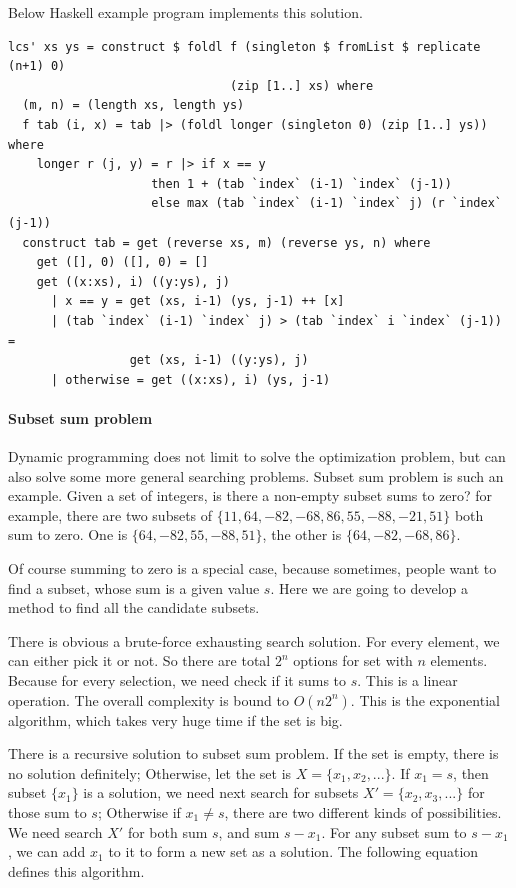 \documentclass[UTF8]{article}
\begin{document}
Below Haskell example program implements this solution.

\lstset{language=Haskell}
\begin{lstlisting}
lcs' xs ys = construct $ foldl f (singleton $ fromList $ replicate (n+1) 0)
                               (zip [1..] xs) where
  (m, n) = (length xs, length ys)
  f tab (i, x) = tab |> (foldl longer (singleton 0) (zip [1..] ys)) where
    longer r (j, y) = r |> if x == y
                    then 1 + (tab `index` (i-1) `index` (j-1))
                    else max (tab `index` (i-1) `index` j) (r `index` (j-1))
  construct tab = get (reverse xs, m) (reverse ys, n) where
    get ([], 0) ([], 0) = []
    get ((x:xs), i) ((y:ys), j)
      | x == y = get (xs, i-1) (ys, j-1) ++ [x]
      | (tab `index` (i-1) `index` j) > (tab `index` i `index` (j-1)) =
                 get (xs, i-1) ((y:ys), j)
      | otherwise = get ((x:xs), i) (ys, j-1)
\end{lstlisting}

\paragraph{Subset sum problem}
Dynamic programming does not limit to solve the optimization problem, but
can also solve some more general searching problems. Subset sum
problem is such an example. Given a set of integers, is there a non-empty
subset sums to zero? for example, there are
two subsets of
$\{11, 64, -82, -68, 86, 55, -88, -21, 51\}$ both sum to zero. One
is $\{64, -82, 55, -88, 51\}$, the other is $\{64, -82, -68, 86\}$.

Of course summing to zero is a special
case, because sometimes, people want to find a subset, whose sum is a
given value $s$. Here we are going to develop a method to find all the
candidate subsets.

There is obvious a brute-force exhausting search solution. For every
element, we can either pick it or not. So there are total $2^n$ options
for set with $n$ elements. Because for every selection, we need
check if it sums to $s$. This is a linear operation. The overall
complexity is bound to $O(n2^n)$. This is the exponential algorithm, which
takes very huge time if the set is big.

There is a recursive solution to subset sum problem. If the set is empty,
there is no solution definitely; Otherwise, let the set is $X = \{x_1, x_2, ...\}$.
If $x_1 = s$, then subset $\{x_1\}$ is a solution, we need
next search for subsets $X' = \{x_2, x_3, ...\}$ for those sum to $s$;
Otherwise if $x_1 \neq s$, there are two different kinds of possibilities.
We need search $X'$ for both sum $s$, and sum $s-x_1$. For any subset
sum to $s-x_1$, we can add $x_1$ to it to form a new set as a solution.
The following equation defines this algorithm.
\end{document}
